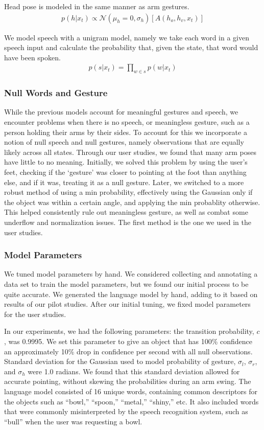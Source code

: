 \documentclass[a4paper, 11pt]{article} %
\begin{document}

Head pose is modeled in the same manner as arm gestures.
\begin{align}
p(h | x_t) \propto \mathcal{N}(\mu_h=0, \sigma_h)[A(h_o, h_v, x_t)]
\end{align}



We model speech with a unigram model, namely we
take each word in a given speech input and calculate the probability that, given the state, that word would have been spoken.
\begin{align}
p(s |x_t) = \displaystyle \prod_{w \in s} p(w | x_t)
\end{align}
\subsubsection{Null Words and Gesture}
While the previous models account for meaningful gestures and speech, we encounter problems when there is no speech, or meaningless gesture, such as a person holding their arms by their sides. To account for this we incorporate a notion of null speech and null gestures, namely observations that are equally likely across all states. Through our user studies, we found that many arm poses have little to no meaning. Initially, we solved this problem by using the user's feet, checking if the `gesture' was closer to pointing at the foot than anything else, and if it was, treating it as a null gesture. Later, we switched to a more robust method of using a min probability, effectively using the Gaussian only if the object was within a certain angle, and applying the min probablity otherwise. This helped consistently rule out meaningless gesture, as well as combat some underflow and normalization issues. The first method is the one we used in the user studies.
\subsubsection{Model Parameters}
We tuned model parameters by hand.  We considered collecting and
annotating a data set to train the model parameters, but we found our
initial process to be quite accurate. We generated the language model
by hand, adding to it based on results of our pilot
studies. After our initial tuning, we fixed
 model parameters for the user studies.

In our experiments, we had the following parameters: the transition
probability, $c$, was 0.9995. We set this parameter to give an object
that has 100\% confidence an approximately 10\% drop in confidence per
second with all null observations.  Standard deviation for the
Gaussian used to model probability of gesture, $\sigma_l$, $\sigma_r$,
and $\sigma_h$ were 1.0 radians. We found that this standard deviation
allowed for accurate pointing, without skewing the probabilities
during an arm swing.  The language model consisted of 16 unique words,
containing common descriptors for the objects such as ``bowl,''
``spoon,'' ``metal,'' ``shiny,'' etc. It also included words that were
commonly misinterpreted by the speech recognition system, such as
``bull'' when the user was requesting a bowl.
\end{document}
